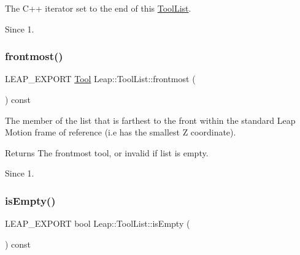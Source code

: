 The C++ iterator set to the end of this \hyperlink{class_leap_1_1_tool_list}{Tool\+List}.


\begin{DoxyCodeInclude}
\end{DoxyCodeInclude}


\begin{DoxySince}{Since}
1. 
\end{DoxySince}
\mbox{\label{class_leap_1_1_tool_list_a906b0ad79923a20d009a021e03345e4f}} 
\subsubsection{\texorpdfstring{frontmost()}{frontmost()}}
{\footnotesize\ttfamily L\+E\+A\+P\+\_\+\+E\+X\+P\+O\+RT \hyperlink{class_leap_1_1_tool}{Tool} Leap\+::\+Tool\+List\+::frontmost (\begin{DoxyParamCaption}{ }\end{DoxyParamCaption}) const}

The member of the list that is farthest to the front within the standard Leap Motion frame of reference (i.\+e has the smallest Z coordinate).


\begin{DoxyCodeInclude}
\end{DoxyCodeInclude}


\begin{DoxyReturn}{Returns}
The frontmost tool, or invalid if list is empty. 
\end{DoxyReturn}
\begin{DoxySince}{Since}
1. 
\end{DoxySince}
\mbox{\label{class_leap_1_1_tool_list_a2db50cd3944d2f6af53bb4c492c6ef91}} 
\subsubsection{\texorpdfstring{is\+Empty()}{isEmpty()}}
{\footnotesize\ttfamily L\+E\+A\+P\+\_\+\+E\+X\+P\+O\+RT bool Leap\+::\+Tool\+List\+::is\+Empty (\begin{DoxyParamCaption}{ }\end{DoxyParamCaption}) const}

